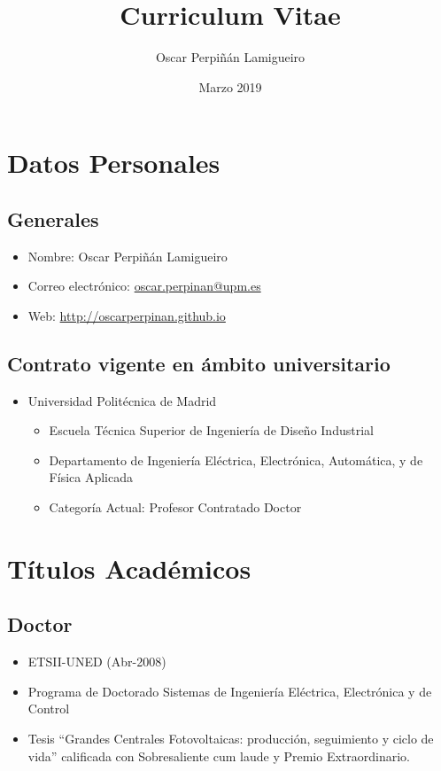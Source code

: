 \documentclass[article, a4paper]{memoir}
\author{Oscar Perpiñán Lamigueiro}
\date{Marzo 2019}
\title{Curriculum Vitae}
\begin{document}
\maketitle

\section{Datos Personales}
\label{sec:orgf5e8063}
\subsection{Generales}
\label{sec:org5c3be01}

\begin{itemize}
\item Nombre: Oscar Perpiñán Lamigueiro
\item Correo electrónico: \href{mailto:oscar.perpinan@upm.es}{oscar.perpinan@upm.es}
\item Web: \url{http://oscarperpinan.github.io}
\end{itemize}

\subsection{Contrato vigente en ámbito universitario}
\label{sec:org30f6753}

\begin{itemize}
\item Universidad Politécnica de Madrid
\begin{itemize}
\item Escuela Técnica Superior de Ingeniería de Diseño Industrial
\item Departamento de Ingeniería Eléctrica, Electrónica, Automática, y de Física Aplicada
\item Categoría Actual: Profesor Contratado Doctor
\end{itemize}
\end{itemize}


\section{Títulos Académicos}
\label{sec:org98b0b4b}
\subsection{Doctor}
\label{sec:org6e22762}
\begin{itemize}
\item ETSII-UNED (Abr-2008)
\item Programa de Doctorado \guillemotleft{}Sistemas de Ingeniería Eléctrica, Electrónica y de Control\guillemotright{}
\item Tesis ``Grandes Centrales Fotovoltaicas: producción, seguimiento y ciclo de vida'' calificada con Sobresaliente cum laude y Premio Extraordinario.
\end{itemize}
\end{document}

